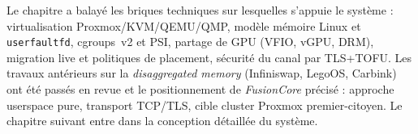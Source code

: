 Le chapitre a balayé les briques techniques sur lesquelles s'appuie le système : virtualisation Proxmox/KVM/QEMU/QMP, modèle mémoire Linux et \texttt{userfaultfd}, cgroups~v2 et PSI, partage de GPU (VFIO, vGPU, DRM), migration live et politiques de placement, sécurité du canal par TLS+TOFU. Les travaux antérieurs sur la \emph{disaggregated memory} (Infiniswap, LegoOS, Carbink) ont été passés en revue et le positionnement de \emph{FusionCore} précisé : approche userspace pure, transport TCP/TLS, cible cluster Proxmox premier-citoyen. Le chapitre suivant entre dans la conception détaillée du système.
